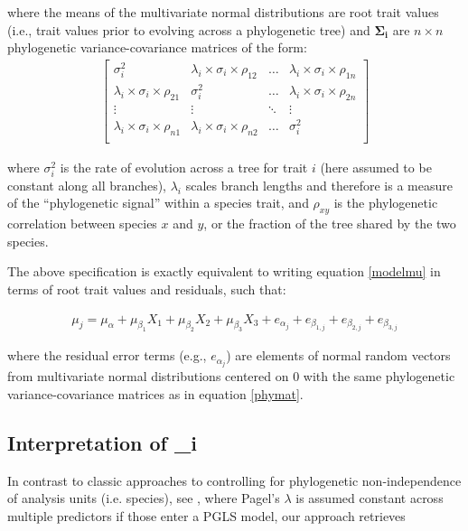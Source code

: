 \documentclass{article}\usepackage[]{graphicx}\usepackage[]{color}
\begin{document}
\noindent where the means of the multivariate normal distributions are root trait values (i.e., trait values prior to evolving across a phylogenetic tree) and $\boldsymbol{\Sigma_i}$ are $n \times n$ phylogenetic variance-covariance matrices of the form: \\

\begin{align}
  \label{phymat}
\begin{bmatrix}
  \sigma^2_i & \lambda_i \times \sigma_{i} \times \rho_{12} & \ldots & \lambda_i \times \sigma_{i} \times \rho_{1n} \\
  \lambda_i \times \sigma_i \times \rho_{21} & \sigma^2_i & \ldots & \lambda_i \times \sigma_{i} \times \rho_{2n} \\
  \vdots & \vdots & \ddots & \vdots \\
  \lambda_i \times \sigma_i \times \rho_{n1} & \lambda_i \times \sigma_i \times \rho_{n2} & \ldots & \sigma^2_i \\
\end{bmatrix}
\end{align}

\noindent where $\sigma_i^2$ is the rate of evolution across a tree for trait $i$ (here assumed to be constant along all branches), $\lambda_i$ scales branch lengths and therefore is a measure of the ``phylogenetic signal'' within a species trait, and $\rho_{xy}$ is the phylogenetic correlation between species $x$ and $y$, or the fraction of the tree shared by the two species.

The above specification is exactly equivalent to writing equation \ref{modelmu} in terms of root trait values and residuals, such that:

\begin{align}
  \mu_j = \mu_\alpha + \mu_{\beta_1} X_1 + \mu_{\beta_2} X_2 + \mu_{\beta_3} X_3 + e_{\alpha_{j}} + e_{\beta_{1,j}} + e_{\beta_{2,j}} + e_{\beta_{3,j}}
\end{align}

\noindent where the residual error terms (e.g., $e_{\alpha_{j}}$) are elements of normal random vectors from multivariate normal distributions centered on $0$ with the same phylogenetic variance-covariance matrices as in equation \ref{phymat}.


\subsection*{Interpretation of \lambda_i}

\item In contrast to classic approaches to controlling for phylogenetic non-independence of analysis units (i.e. species), see \citep{freckleton2002phylogenetic}, where Pagel's \cite{pagel1999inferring} $\lambda$ is assumed constant across multiple predictors if those enter a PGLS model, our approach retrieves 
\end{document}
